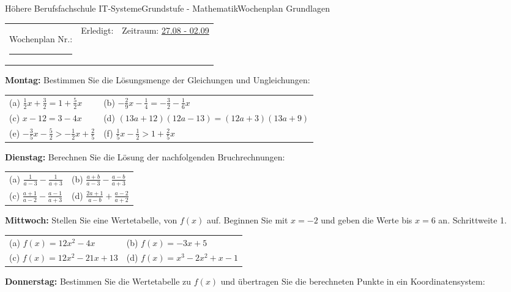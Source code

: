 \documentclass[oneside,openany,headings=optiontotoc,11pt,numbers=noenddot]{scrreprt}
\begin{document}
	\begin{worksheet}{Höhere Berufsfachschule IT-Systeme}{Grundstufe - Mathematik}{Wochenplan Grundlagen}
		\noindent
		\begin{tabularx}{\textwidth}{XXl}
			Wochenplan Nr.: \rule{0.15\textwidth}{1pt} & Erledigt: & Zeitraum: \underline{27.08 - 02.09}
		\end{tabularx}
	
		\begin{framed}
			\noindent
			\textbf{Montag:}  Bestimmen Sie die Lösungsmenge der Gleichungen und Ungleichungen:\\
			\begin{tabularx}{\textwidth}{XX}
				(a) \(\frac{1}{2}x + \frac{3}{2} = 1 + \frac{5}{2}x\) & (b) \(-\frac{2}{9}x - \frac{1}{4} = -\frac{3}{2}-\frac{1}{6}x\)\\
				(c) \(x-12 = 3-4x\) &	(d) \((13a+12)(12a-13) = (12a+3)(13a+9)\)\\
				(e) \(-\frac{3}{5}x-\frac{5}{2} > -\frac{1}{2}x + \frac{2}{5}\) & (f) \(\frac{1}{5}x-\frac{1}{2}>1+\frac{2}{5}x\)
			\end{tabularx}
		\end{framed}
		\begin{framed}
			\noindent
			\textbf{Dienstag:} Berechnen Sie die Lösung der nachfolgenden Bruchrechnungen:\\
			\begin{tabularx}{\textwidth}{XX}
				(a) \(\frac{1}{a-3} - \frac{1}{a+3}\) & (b) \(\frac{a+b}{a-3}-\frac{a-b}{a+3}\)\\
				(c) \(\frac{a+1}{a-2}- \frac{a-1}{a+3}\) & (d) \(\frac{2a+1}{a-b} + \frac{a-2}{a+2}\)
			\end{tabularx}
		\end{framed}
		\begin{framed}
			\noindent
			\textbf{Mittwoch:} Stellen Sie eine Wertetabelle, von \(f(x)\) auf. Beginnen Sie mit \(x = -2\) und geben die Werte bis \(x = 6\) an. Schrittweite 1.\\
			\begin{tabularx}{\textwidth}{XX}
				(a) \(f(x) = 12x^2 - 4x\) & (b) \(f(x) = -3x + 5\)\\
				(c) \(f(x) = 12x^2-21x+13\) & (d) \(f(x) = x^3 - 2x^2 + x - 1\)
			\end{tabularx}
		\end{framed}
		\begin{framed}
			\noindent
			\textbf{Donnerstag:} Bestimmen Sie die Wertetabelle zu \(f(x)\) und übertragen Sie die berechneten Punkte in ein Koordinatensystem:\\

\end{framed}
\end{worksheet}
\end{document}
